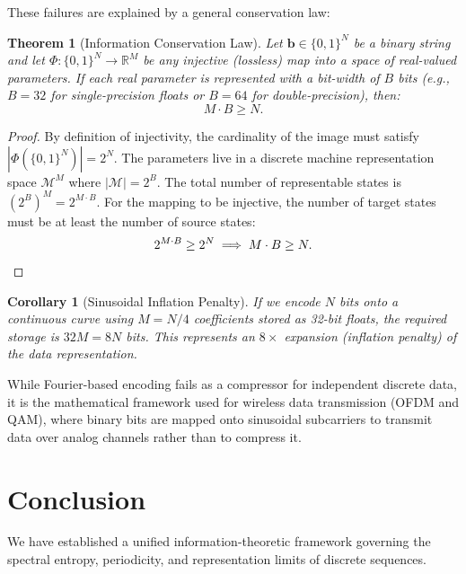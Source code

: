 \documentclass[11pt,twoside]{article}
\newtheorem{theorem}{Theorem}
\newtheorem{corollary}{Corollary}
\begin{document}
These failures are explained by a general conservation law:

\begin{theorem}[Information Conservation Law]
	Let $\mathbf{b} \in \{0,1\}^N$ be a binary string and let $\Phi: \{0,1\}^N \to \mathbb{R}^M$ be any injective (lossless) map into a space of real-valued parameters. If each real parameter is represented with a bit-width of $B$ bits (e.g., $B = 32$ for single-precision floats or $B = 64$ for double-precision), then:
	\begin{equation}
		M \cdot B \geq N.
	\end{equation}
\end{theorem}

\begin{proof}
	By definition of injectivity, the cardinality of the image must satisfy $|\Phi(\{0,1\}^N)| = 2^N$. The parameters live in a discrete machine representation space $\mathcal{M}^M$ where $|\mathcal{M}| = 2^B$. The total number of representable states is $(2^B)^M = 2^{M \cdot B}$. For the mapping to be injective, the number of target states must be at least the number of source states:
	\begin{equation}
		2^{M \cdot B} \geq 2^N \implies M \cdot B \geq N. \qedhere
	\end{equation}
\end{proof}

\begin{corollary}[Sinusoidal Inflation Penalty]
	If we encode $N$ bits onto a continuous curve using $M = N/4$ coefficients stored as 32-bit floats, the required storage is $32 M = 8 N$ bits. This represents an $8\times$ expansion (inflation penalty) of the data representation.
\end{corollary}

While Fourier-based encoding fails as a compressor for independent discrete data, it is the mathematical framework used for wireless data transmission (OFDM and QAM), where binary bits are mapped onto sinusoidal subcarriers to transmit data over analog channels rather than to compress it.

\section{Conclusion}

We have established a unified information-theoretic framework governing the spectral entropy, periodicity, and representation limits of discrete sequences. 
\end{document}

